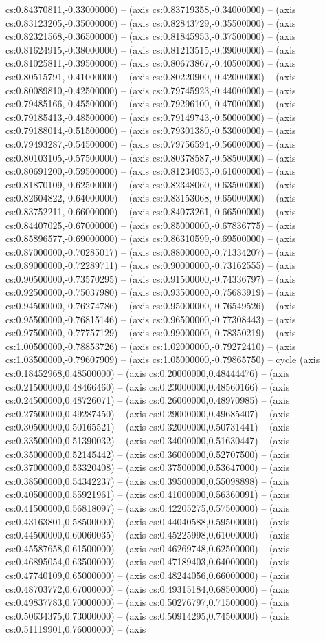 cs:0.84370811,-0.33000000) -- (axis cs:0.83719358,-0.34000000) -- (axis cs:0.83123205,-0.35000000) -- (axis cs:0.82843729,-0.35500000) -- (axis cs:0.82321568,-0.36500000) -- (axis cs:0.81845953,-0.37500000) -- (axis cs:0.81624915,-0.38000000) -- (axis cs:0.81213515,-0.39000000) -- (axis cs:0.81025811,-0.39500000) -- (axis cs:0.80673867,-0.40500000) -- (axis cs:0.80515791,-0.41000000) -- (axis cs:0.80220900,-0.42000000) -- (axis cs:0.80089810,-0.42500000) -- (axis cs:0.79745923,-0.44000000) -- (axis cs:0.79485166,-0.45500000) -- (axis cs:0.79296100,-0.47000000) -- (axis cs:0.79185413,-0.48500000) -- (axis cs:0.79149743,-0.50000000) -- (axis cs:0.79188014,-0.51500000) -- (axis cs:0.79301380,-0.53000000) -- (axis cs:0.79493287,-0.54500000) -- (axis cs:0.79756594,-0.56000000) -- (axis cs:0.80103105,-0.57500000) -- (axis cs:0.80378587,-0.58500000) -- (axis cs:0.80691200,-0.59500000) -- (axis cs:0.81234053,-0.61000000) -- (axis cs:0.81870109,-0.62500000) -- (axis cs:0.82348060,-0.63500000) -- (axis cs:0.82604822,-0.64000000) -- (axis cs:0.83153068,-0.65000000) -- (axis cs:0.83752211,-0.66000000) -- (axis cs:0.84073261,-0.66500000) -- (axis cs:0.84407025,-0.67000000) -- (axis cs:0.85000000,-0.67836775) -- (axis cs:0.85896577,-0.69000000) -- (axis cs:0.86310599,-0.69500000) -- (axis cs:0.87000000,-0.70285017) -- (axis cs:0.88000000,-0.71334207) -- (axis cs:0.89000000,-0.72289711) -- (axis cs:0.90000000,-0.73162555) -- (axis cs:0.90500000,-0.73570295) -- (axis cs:0.91500000,-0.74336797) -- (axis cs:0.92500000,-0.75037980) -- (axis cs:0.93500000,-0.75683919) -- (axis cs:0.94500000,-0.76274786) -- (axis cs:0.95000000,-0.76549526) -- (axis cs:0.95500000,-0.76815146) -- (axis cs:0.96500000,-0.77308443) -- (axis cs:0.97500000,-0.77757129) -- (axis cs:0.99000000,-0.78350219) -- (axis cs:1.00500000,-0.78853726) -- (axis cs:1.02000000,-0.79272410) -- (axis cs:1.03500000,-0.79607909) -- (axis cs:1.05000000,-0.79865750) -- cycle (axis cs:0.18452968,0.48500000) -- (axis cs:0.20000000,0.48444476) -- (axis cs:0.21500000,0.48466460) -- (axis cs:0.23000000,0.48560166) -- (axis cs:0.24500000,0.48726071) -- (axis cs:0.26000000,0.48970985) -- (axis cs:0.27500000,0.49287450) -- (axis cs:0.29000000,0.49685407) -- (axis cs:0.30500000,0.50165521) -- (axis cs:0.32000000,0.50731441) -- (axis cs:0.33500000,0.51390032) -- (axis cs:0.34000000,0.51630447) -- (axis cs:0.35000000,0.52145442) -- (axis cs:0.36000000,0.52707500) -- (axis cs:0.37000000,0.53320408) -- (axis cs:0.37500000,0.53647000) -- (axis cs:0.38500000,0.54342237) -- (axis cs:0.39500000,0.55098898) -- (axis cs:0.40500000,0.55921961) -- (axis cs:0.41000000,0.56360091) -- (axis cs:0.41500000,0.56818097) -- (axis cs:0.42205275,0.57500000) -- (axis cs:0.43163801,0.58500000) -- (axis cs:0.44040588,0.59500000) -- (axis cs:0.44500000,0.60060035) -- (axis cs:0.45225998,0.61000000) -- (axis cs:0.45587658,0.61500000) -- (axis cs:0.46269748,0.62500000) -- (axis cs:0.46895054,0.63500000) -- (axis cs:0.47189403,0.64000000) -- (axis cs:0.47740109,0.65000000) -- (axis cs:0.48244056,0.66000000) -- (axis cs:0.48703772,0.67000000) -- (axis cs:0.49315184,0.68500000) -- (axis cs:0.49837783,0.70000000) -- (axis cs:0.50276797,0.71500000) -- (axis cs:0.50634375,0.73000000) -- (axis cs:0.50914295,0.74500000) -- (axis cs:0.51119901,0.76000000) -- (axis 